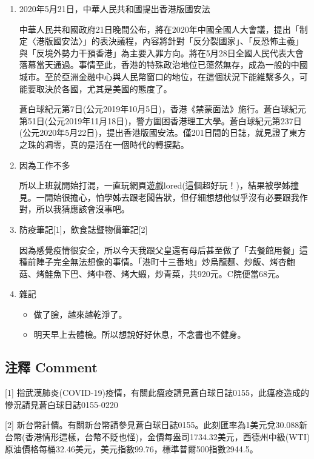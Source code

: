 \documentclass[a5paper, 11pt
]{book}
\providecommand{\tightlist}{%
  \setlength{\itemsep}{0pt}\setlength{\parskip}{0pt}}
\begin{document}
\begin{enumerate}
\def\labelenumi{\arabic{enumi}.}
\item
  2020年5月21日，中華人民共和國提出香港版國安法

  中華人民共和國政府21日晚間公布，將在2020年中國全國人大會議，提出「制定〈港版國安法〉」的表決議程，內容將針對「反分裂國家」、「反恐怖主義」與「反境外勢力干預香港」為主要入罪方向。將在5月28日全國人民代表大會落幕當天通過。事情至此，香港的特殊政治地位已蕩然無存，成為一般的中國城市。至於亞洲金融中心與人民幣窗口的地位，在這個狀況下能維繫多久，可能要取決於各國，尤其是美國的態度了。

  蒼白球紀元第7日(公元2019年10月5日)，香港《禁蒙面法》施行。蒼白球紀元第51日(公元2019年11月18日)，警方圍困香港理工大學。蒼白球紀元第237日(公元2020年5月22日)，提出香港版國安法。僅201日間的日誌，就見證了東方之珠的凋零，真的是活在一個時代的轉捩點。
\item
  因為工作不多

  所以上班就開始打混，一直玩網頁遊戲lored(這個超好玩！)，結果被學姊撞見。一開始很擔心，怕學姊去跟老闆告狀，但仔細想想他似乎沒有必要跟我作對，所以我猜應該會沒事吧。
\item
  防疫筆記{[}1{]}，飲食誌暨物價筆記{[}2{]}

  因為感覺疫情很安全，所以今天我跟父皇還有母后甚至做了「去餐館用餐」這種前陣子完全無法想像的事情。「港町十三番地」炒烏龍麵、炒飯、烤杏鮑菇、烤鮭魚下巴、烤中卷、烤大蝦，炒青菜，共920元。C院便當68元。
\item
  雜記

  \begin{itemize}
  \tightlist
  \item
    做了臉，越來越乾淨了。
  \item
    明天早上去體檢。所以想說好好休息，不念書也不健身。
  \end{itemize}
\end{enumerate}

\hypertarget{ux6ce8ux91cb-comment-82}{%
\subsection{注釋 Comment}\label{ux6ce8ux91cb-comment-82}}

{[}1{]}
指武漢肺炎(COVID-19)疫情，有關此瘟疫請見蒼白球日誌0155，此瘟疫造成的慘況請見蒼白球日誌0155-0220

{[}2{]}
新台幣計價。有關新台幣請參見蒼白球日誌0155。此刻匯率為1美元兌30.088新台幣(香港情形這樣，台幣不貶也怪)，金價每盎司1734.32美元，西德州中級(WTI)原油價格每桶32.46美元，美元指數99.76，標準普爾500指數2944.5。
\end{document}
